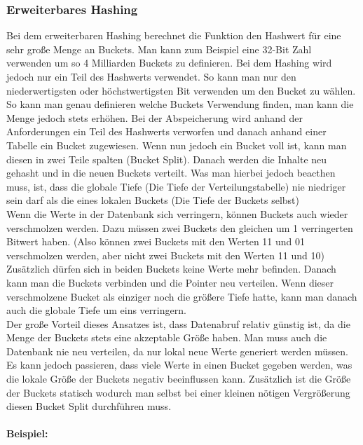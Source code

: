 \documentclass{article}
\newcommand{\paragraphlb}[1]{\paragraph{#1}\mbox{}\\}
\begin{document}
	\subsubsection{Erweiterbares Hashing}
	Bei dem erweiterbaren Hashing berechnet die Funktion den Hashwert für eine sehr große Menge an Buckets. Man kann zum Beispiel eine 32-Bit Zahl verwenden um so 4 Milliarden Buckets zu definieren. Bei dem Hashing wird jedoch nur ein Teil des Hashwerts verwendet. So kann man nur den niederwertigsten oder höchstwertigsten Bit verwenden um den Bucket zu wählen. So kann man genau definieren welche Buckets Verwendung finden, man kann die Menge jedoch stets erhöhen. Bei der Abspeicherung wird anhand der Anforderungen ein Teil des Hashwerts verworfen und danach anhand einer Tabelle ein Bucket zugewiesen. Wenn nun jedoch ein Bucket voll ist, kann man diesen in zwei Teile spalten (Bucket Split). Danach werden die Inhalte neu gehasht und in die neuen Buckets verteilt. Was man hierbei jedoch beacthen muss, ist, dass die globale Tiefe (Die Tiefe der Verteilungstabelle) nie niedriger sein darf als die eines lokalen Buckets (Die Tiefe der Buckets selbst)\\
	Wenn die Werte in der Datenbank sich verringern, können Buckets auch wieder verschmolzen werden. Dazu müssen zwei Buckets den gleichen um 1 verringerten Bitwert haben. (Also können zwei Buckets mit den Werten 11 und 01 verschmolzen werden, aber nicht zwei Buckets mit den Werten 11 und 10) Zusätzlich dürfen sich in beiden Buckets keine Werte mehr befinden. Danach kann man die Buckets verbinden und die Pointer neu verteilen. Wenn dieser verschmolzene Bucket als einziger noch die größere Tiefe hatte, kann man danach auch die globale Tiefe um eins verringern. \\
	Der große Vorteil dieses Ansatzes ist, dass Datenabruf relativ günstig ist, da die Menge der Buckets stets eine akzeptable Größe haben. Man muss auch die Datenbank nie neu verteilen, da nur lokal neue Werte generiert werden müssen. Es kann jedoch passieren, dass viele Werte in einen Bucket gegeben werden, was die lokale Größe der Buckets negativ beeinflussen kann. Zusätzlich ist die Größe der Buckets statisch wodurch man selbst bei einer kleinen nötigen Vergrößerung diesen Bucket Split durchführen muss.
	\paragraphlb{Beispiel:}
\end{document}

